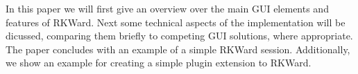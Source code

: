 In this paper we will first give an overview over the main GUI elements and
features of RKWard. Next some technical aspects of the implementation will be
dicussed, comparing them briefly to competing GUI solutions, where appropriate.
The paper concludes with an example of a simple RKWard session. Additionally,
we show an example for creating a simple plugin extension to RKWard.

